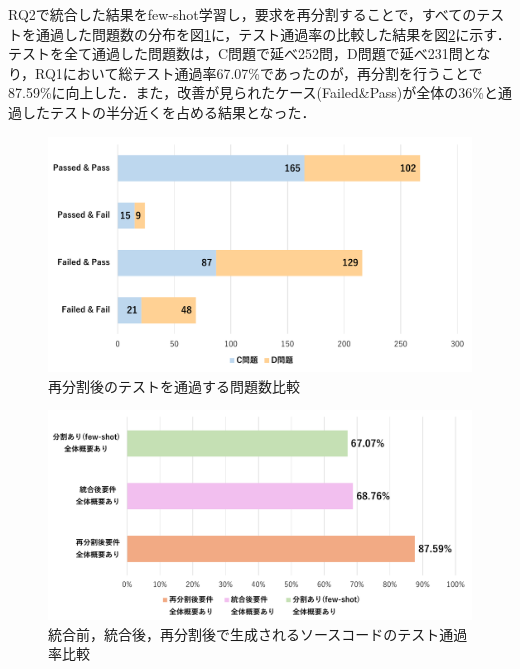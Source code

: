 \documentclass[submit,techrep,noauthor]{ipsj}
\begin{document}
RQ2で統合した結果をfew-shot学習し，要求を再分割することで，すべてのテストを通過した問題数の分布を図\ref{rq3_1}に，テスト通過率の比較した結果を図\ref{rq3_2}に示す．テストを全て通過した問題数は，C問題で延べ252問，D問題で延べ231問となり，RQ1において総テスト通過率67.07\%であったのが，再分割を行うことで87.59\%に向上した．また，改善が見られたケース(Failed\&Pass)が全体の36\%と通過したテストの半分近くを占める結果となった．




\begin{figure}[t]
    \centering
    \includegraphics[width=1.0\linewidth]{./Toyoshima_fig/RQ3_1.pdf}
    \caption{再分割後のテストを通過する問題数比較}
    \label{rq3_1}
\end{figure}

\begin{figure}[t]
    \centering
    \includegraphics[width=1.0\linewidth]{./Toyoshima_fig/RQ3_2.pdf}
    \caption{統合前，統合後，再分割後で生成されるソースコードのテスト通過率比較}
    \label{rq3_2}
\end{figure}
\end{document}
